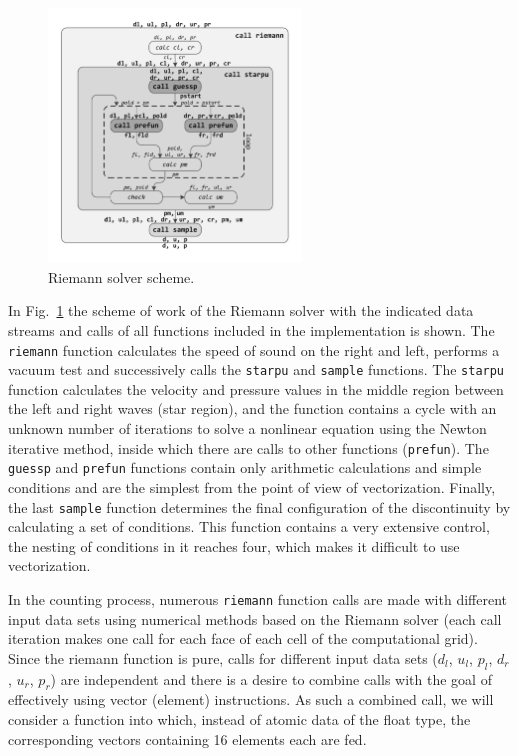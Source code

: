 \documentclass[
11pt,%
tightenlines,%
twoside,%
onecolumn,%
nofloats,%
nobibnotes,%
nofootinbib,%
superscriptaddress,%
noshowpacs,%
centertags]%
{revtex4}
\begin{document}
\begin{figure}[h]
\setcaptionmargin{5mm}
\onelinecaptionstrue
\includegraphics[width=0.6\textwidth]{pics/riemann.pdf}
\caption{Riemann solver scheme.}\label{fig:riemann_scheme}
\end{figure}

In Fig.~\ref{fig:riemann_scheme} the scheme of work of the Riemann solver with the indicated data streams and calls of all functions included in the implementation is shown.
The \texttt{riemann} function calculates the speed of sound on the right and left, performs a vacuum test and successively calls the \texttt{starpu} and \texttt{sample} functions.
The \texttt{starpu} function calculates the velocity and pressure values in the middle region between the left and right waves (star region), and the function contains a cycle with an unknown number of iterations to solve a nonlinear equation using the Newton iterative method, inside which there are calls to other functions (\texttt{prefun}).
The \texttt{guessp} and \texttt{prefun} functions contain only arithmetic calculations and simple conditions and are the simplest from the point of view of vectorization.
Finally, the last \texttt{sample} function determines the final configuration of the discontinuity by calculating a set of conditions.
This function contains a very extensive control, the nesting of conditions in it reaches four, which makes it difficult to use vectorization.

In the counting process, numerous \texttt{riemann} function calls are made with different input data sets using numerical methods based on the Riemann solver (each call iteration makes one call for each face of each cell of the computational grid).
Since the riemann function is pure, calls for different input data sets ($d_l$, $u_l$, $p_l$, $d_r$, $u_r$, $p_r$) are independent and there is a desire to combine calls with the goal of effectively using vector (element) instructions.
As such a combined call, we will consider a function into which, instead of atomic data of the float type, the corresponding vectors containing 16 elements each are fed.
\end{document}

